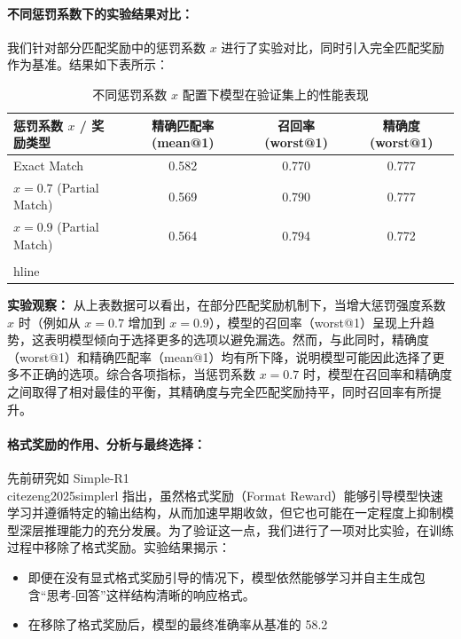 \documentclass{pkuthesis}
\begin{document}
\paragraph{不同惩罚系数下的实验结果对比：}
我们针对部分匹配奖励中的惩罚系数 $x$ 进行了实验对比，同时引入完全匹配奖励作为基准。结果如下表所示：

\begin{table}[h]
\centering
\caption{不同惩罚系数 $x$ 配置下模型在验证集上的性能表现}
\begin{tabular}{l|c|c|c}
\hline
惩罚系数 $x$ / 奖励类型 & 精确匹配率 (mean@1) & 召回率 (worst@1) & 精确度 (worst@1) \\
\hline
Exact Match & 0.582 & 0.770 & 0.777 \\
$x=0.7$ (Partial Match) & 0.569 & 0.790 & 0.777 \\
$x=0.9$ (Partial Match) & 0.564 & 0.794 & 0.772 \\
\\hline
\end{tabular}
\end{table}

\textbf{实验观察：} 从上表数据可以看出，在部分匹配奖励机制下，当增大惩罚强度系数 $x$ 时（例如从 $x=0.7$ 增加到 $x=0.9$），模型的召回率（worst@1）呈现上升趋势，这表明模型倾向于选择更多的选项以避免漏选。然而，与此同时，精确度（worst@1）和精确匹配率（mean@1）均有所下降，说明模型可能因此选择了更多不正确的选项。综合各项指标，当惩罚系数 $x=0.7$ 时，模型在召回率和精确度之间取得了相对最佳的平衡，其精确度与完全匹配奖励持平，同时召回率有所提升。

\paragraph{格式奖励的作用、分析与最终选择：}
先前研究如 Simple-R1 \\cite{zeng2025simplerl} 指出，虽然格式奖励（Format Reward）能够引导模型快速学习并遵循特定的输出结构，从而加速早期收敛，但它也可能在一定程度上抑制模型深层推理能力的充分发展。为了验证这一点，我们进行了一项对比实验，在训练过程中移除了格式奖励。实验结果揭示：
\begin{itemize}
\item 即便在没有显式格式奖励引导的情况下，模型依然能够学习并自主生成包含“思考-回答”这样结构清晰的响应格式。
\item 在移除了格式奖励后，模型的最终准确率从基准的 58.2%
\end{itemize}
\end{document}

